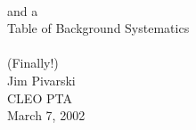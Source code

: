 

\newcommand{\talktitle}[0]{{\sc Beamgas} and a Table of Background Systematics (Finally!)}
\newcommand{\fmttitle}[0]{}
\newcommand{\conftitle}[0]{CLEO PTA}
\newcommand{\myname}[0]{Jim Pivarski}
\newcommand{\affila}[0]{Cornell University}
\newcommand{\talkdate}[0]{March 7, 2002}

\pagestyle{conference}   %




\slideheight 7.0in
\slidewidth 8.8in 

\renewcommand{\arraystretch}{0.3}
\renewcommand{\slidetopmargin}{0.4in}
\renewcommand{\slidebottommargin}{0.9in}



\begin{slide*}

\slideframe{}

\begin{center}
\vspace{4 cm}
{\Huge {} \\ and a \\ Table of Background Systematics \\ \mbox{ } \\ (Finally!) } \\
\vspace{1 cm}
{\LARGE \black	Jim Pivarski } \\
\vspace{2 cm}
\conftitle \\
{\large \black \talkdate}

\end{center}

\end{slide*}


